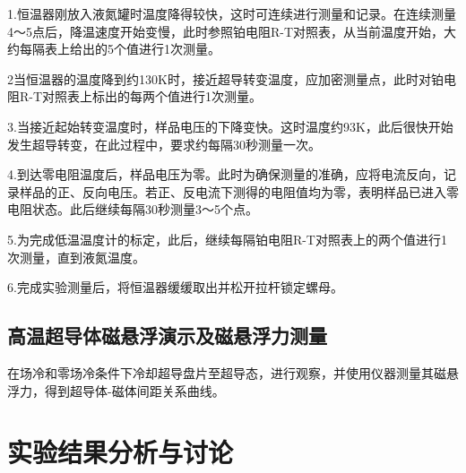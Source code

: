 \documentclass[UTF8]{ctexart}
\begin{document}
\begin{multicols}{2}
1.恒温器刚放入液氮罐时温度降得较快，这时可连续进行测量和记录。在连续测量4～5点后，降温速度开始变慢，此时参照铂电阻R-T对照表，从当前温度开始，大约每隔表上给出的5个值进行1次测量。

2当恒温器的温度降到约130K时，接近超导转变温度，应加密测量点，此时对铂电阻R-T对照表上标出的每两个值进行1次测量。

3.当接近起始转变温度时，样品电压的下降变快。这时温度约93K，此后很快开始发生超导转变，在此过程中，要求约每隔30秒测量一次。

4.到达零电阻温度后，样品电压为零。此时为确保测量的准确，应将电流反向，记录样品的正、反向电压。若正、反电流下测得的电阻值均为零，表明样品已进入零电阻状态。此后继续每隔30秒测量3～5个点。

5.为完成低温温度计的标定，此后，继续每隔铂电阻R-T对照表上的两个值进行1次测量，直到液氮温度。

6.完成实验测量后，将恒温器缓缓取出并松开拉杆锁定螺母。

\subsection{高温超导体磁悬浮演示及磁悬浮力测量}
在场冷和零场冷条件下冷却超导盘片至超导态，进行观察，并使用仪器测量其磁悬浮力，得到超导体-磁体间距关系曲线。

\end{multicols}

\section{实验结果分析与讨论}
\end{document}
